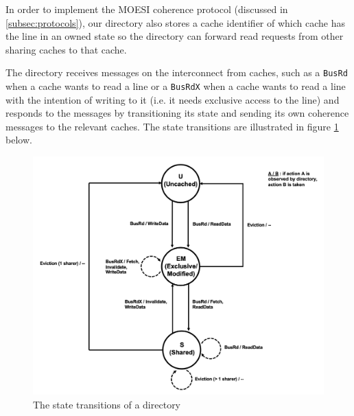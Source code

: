 \documentclass{article}
\begin{document}
In order to implement the MOESI coherence protocol (discussed in \ref{subsec:protocols}), our directory also stores a cache identifier of which cache has the line in an owned state so the directory can forward read requests from other sharing caches to that cache.

The directory receives messages on the interconnect from caches, such as a \texttt{BusRd} when a cache wants to read a line or a \texttt{BusRdX} when a cache wants to read a line with the intention of writing to it (i.e. it needs exclusive access to the line) and responds to the messages by transitioning its state and sending its own coherence messages to the relevant caches.  The state transitions are illustrated in figure \ref{fig:dstates} below.

\begin{figure}[h]
\centering
\includegraphics[width=.7\textwidth]{figures/dstates.png}
\caption{The state transitions of a directory}
\label{fig:dstates}
\end{figure}
\end{document}
